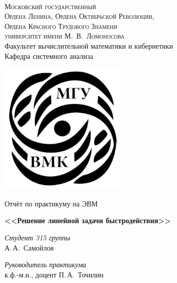 \documentclass{article}
\theoremstyle{definition}
\begin{document}
\thispagestyle{empty}

\begin{center}
\ \vspace{-3cm}

{\scshape Московский государственный\\
Ордена Ленина, Ордена Октябрьской Революции,\\
Ордена Красного Трудового Знамени\\
университет имени М.~В.~Ломоносова}\\
Факультет вычислительной математики и кибернетики\\
Кафедра системного анализа

\vspace{1cm}
\begin{center}
{\includegraphics[width=6cm]{mgu}}
\end{center}
\vspace{1cm}

{\LARGE Отчёт по практикуму на ЭВМ}

\vspace{1cm}

{\Huge\bfseries <<Решение линейной задачи быстродействия>>}
\end{center}

\vspace{1cm}

\begin{flushright}
  \large
  \textit{Студент 315 группы}\\
  А.\,А.~Самойлов

  \vspace{5mm}

  \textit{Руководитель практикума}\\
  к.ф.-м.н., доцент П.\,А.~Точилин
\end{flushright}

\vspace{5cm}
\end{document}
